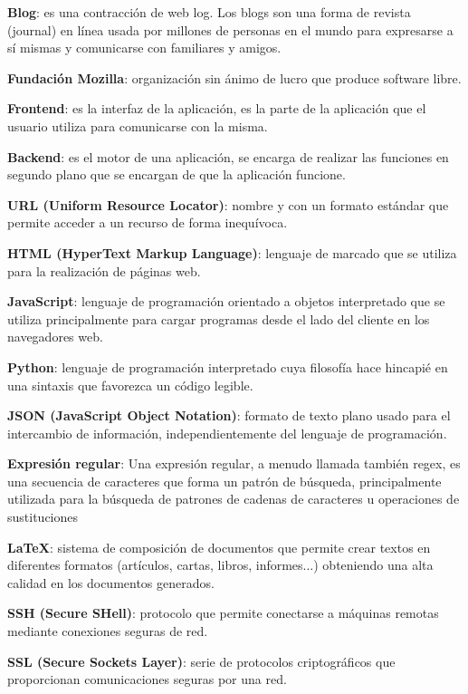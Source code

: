\textbf{Blog}: es una contracción de web log. Los blogs son una forma de revista (journal) en línea usada por millones de personas en el mundo para expresarse a sí mismas y comunicarse con familiares y amigos.
\bigskip

\textbf{Fundación Mozilla}: organización sin ánimo de lucro que produce software libre.
\bigskip

\textbf{Frontend}: es la interfaz de la aplicación, es la parte de la aplicación que el usuario utiliza para comunicarse con la misma.
\bigskip

\textbf{Backend}: es el motor de una aplicación, se encarga de realizar las funciones en segundo plano que se encargan de que la aplicación funcione.
\bigskip

\textbf{URL (Uniform Resource Locator)}: nombre y con un formato estándar que permite acceder a un recurso de forma inequívoca.
\bigskip

\textbf{HTML (HyperText Markup Language)}: lenguaje de marcado que se utiliza para la realización de páginas web.
\bigskip

\textbf{JavaScript}: lenguaje de programación orientado a objetos interpretado que se utiliza principalmente para cargar programas desde el lado del cliente en los navegadores web.
\bigskip

\textbf{Python}: lenguaje de programación interpretado cuya filosofía hace hincapié en una sintaxis que favorezca un código legible.
\bigskip

\textbf{JSON (JavaScript Object Notation)}: formato de texto plano usado para el intercambio de información, independientemente del lenguaje de programación.
\bigskip

\textbf{Expresión regular}: Una expresión regular, a menudo llamada también regex, es una secuencia de caracteres que forma un patrón de búsqueda, principalmente utilizada para la búsqueda de patrones de cadenas de caracteres u operaciones de sustituciones
\bigskip

\textbf{LaTeX}: sistema de composición de documentos que permite crear textos en diferentes formatos (artículos, cartas, libros, informes...) obteniendo una alta calidad en los documentos generados.
\bigskip

\textbf{SSH (Secure SHell)}: protocolo que permite conectarse a máquinas remotas mediante conexiones seguras de red.
\bigskip

\textbf{SSL (Secure Sockets Layer)}: serie de protocolos criptográficos que proporcionan comunicaciones seguras por una red.
\bigskip

